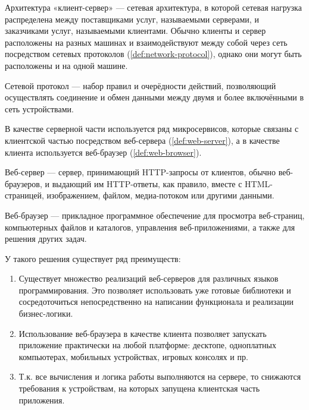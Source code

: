 \begin{definition}
    \label{def:client-server}
    Архитектура «клиент-сервер» — сетевая архитектура, в которой сетевая нагрузка распределена между поставщиками услуг,
    называемыми серверами, и заказчиками услуг, называемыми клиентами. Обычно клиенты и сервер расположены на разных
    машинах и взаимодействуют между собой через сеть посредством сетевых протоколов (\ref{def:network-protocol}),
    однако они могут быть расположены и на одной машине.
\end{definition}

\begin{definition}
    \label{def:network-protocol}
    Сетевой протокол — набор правил и очерёдности действий, позволяющий осуществлять соединение и
    обмен данными между двумя и более включёнными в сеть устройствами.
\end{definition}

\noindent В качестве серверной части используется ряд микросервисов, которые связаны с клиентской частью посредством
веб-сервера (\ref{def:web-server}), а в качестве клиента используется веб-браузер (\ref{def:web-browser}).

\begin{definition}
    \label{def:web-server}
    Веб-сервер — сервер, принимающий HTTP-запросы от клиентов, обычно веб-браузеров, и выдающий им HTTP-ответы,
    как правило, вместе с HTML-страницей, изображением, файлом, медиа-потоком или другими данными.
\end{definition}

\begin{definition}
    \label{def:web-browser}
    Веб-браузер — прикладное программное обеспечение для просмотра веб-страниц, компьютерных файлов и каталогов,
    управления веб-приложениями, а также для решения других задач.
\end{definition}

\noindent У такого решения существует ряд преимуществ:

\begin{enumerate}
    \item Существует множество реализаций веб-серверов для различных языков программирования.
    Это позволяет использовать уже готовые библиотеки и сосредоточиться непосредственно на написании функционала
    и реализации бизнес-логики.
    \item Использование веб-браузера в качестве клиента позволяет запускать приложение практически на любой платформе:
    десктопе, одноплатных компьютерах, мобильных устройствах, игровых консолях и пр.
    \item Т.к. все вычисления и логика работы выполняются на сервере, то снижаются требования к устройствам, на которых
    запущена клиентская часть приложения.
\end{enumerate}


